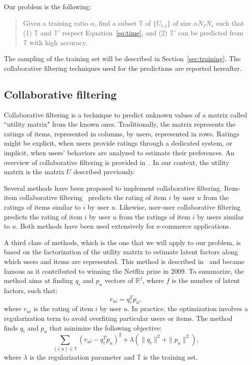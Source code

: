\documentclass[10pt, conference, compsocconf]{IEEEtran}
\begin{document}
Our problem is the following:
\begin{quote}
Given a training ratio $\alpha$, find a subset $\mathbb{T}$ of 
$\{U_{i,j}\}$ of size $\alpha N_f N_s$ such that (1) $\mathbb{T}$ and 
$\mathbb{T'}$ respect Equation~\ref{eq:time}, and (2) $\mathbb{T'}$ can 
be predicted from $\mathbb{T}$ with high accuracy.
\end{quote}
The sampling of the training set will be described in Section~\ref{sec:training}.
The collaborative filtering techniques used for the predictions are reported hereafter.

\subsection{Collaborative filtering}

Collaborative filtering is a technique to predict unknown values of a 
matrix called ``utility matrix" from the known ones. Traditionally, the 
matrix represents the ratings of items, represented in columns, by 
users, represented in rows. Ratings might be explicit, when users 
provide ratings through a dedicated system, or implicit, when users' 
behaviors are analyzed to estimate their preferences. An 
overview of collaborative filtering is provided 
in~\cite{leskovec2014mining}. In our context, the utility matrix is the
matrix $U$ described previously.

Several methods have been proposed to implement collaborative 
filtering. Item-item collaborative filtering~\cite{breese1998empirical, linden2003amazon} predicts 
the rating of item $i$ by user $u$ from the ratings of items similar to 
$i$ by user $u$. Likewise, user-user collaborative 
filtering~\cite{breese1998empirical} predicts the rating of item $i$ by user $u$ 
from the ratings of item $i$ by users similar to $u$. Both methods
have been used extensively for e-commerce applications.

A third class of methods, which is the one that we will apply to our 
problem, is based on the factorization of the utility matrix to 
estimate latent factors along which users and items are represented. 
This method is described 
in~\cite{koren2009matrix} and became famous as it contributed to winning the 
Netflix prize in 2009. To summarize, the method aims at finding $q_i$ 
and $p_u$ vectors of $\mathbb{R}^f$, where $f$ is the number of latent factors, such that:
\begin{equation*}
r_{ui} = q_i^Tp_u,
\end{equation*}
where $r_{ui}$ is the rating of item $i$ by user $u$. In practice, the optimization
involves a regularization term to avoid overfiting particular users or items. The method
finds $q_i$ and $p_u$ that minimize the following objective:
\begin{equation*}
\sum_{(i,u) \in \mathbb{T}}\left( r_{ui} - q_i^Tp_u\right)^2+\lambda \left( \|{q_i}\|^2 + \|{p_u}\|^2\right)
,
\end{equation*}
where $\lambda$ is the regularization parameter and $\mathbb{T}$ is the training set.
\end{document}
